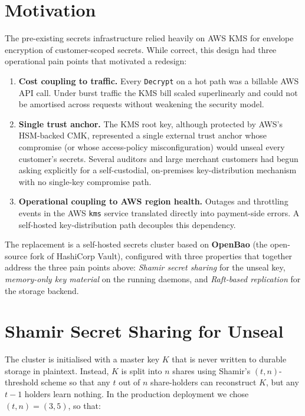 \documentclass[12pt,a4paper,oneside]{report}
\begin{document}
\section{Motivation}

The pre-existing secrets infrastructure relied heavily on AWS KMS for envelope encryption of customer-scoped secrets. While correct, this design had three operational pain points that motivated a redesign:

\begin{enumerate}[leftmargin=*]
    \item \textbf{Cost coupling to traffic.} Every \texttt{Decrypt} on a hot path was a billable AWS API call. Under burst traffic the KMS bill scaled superlinearly and could not be amortised across requests without weakening the security model.
    \item \textbf{Single trust anchor.} The KMS root key, although protected by AWS's HSM-backed CMK, represented a single external trust anchor whose compromise (or whose access-policy misconfiguration) would unseal every customer's secrets. Several auditors and large merchant customers had begun asking explicitly for a self-custodial, on-premises key-distribution mechanism with no single-key compromise path.
    \item \textbf{Operational coupling to AWS region health.} Outages and throttling events in the AWS \texttt{kms} service translated directly into payment-side errors. A self-hosted key-distribution path decouples this dependency.
\end{enumerate}

The replacement is a self-hosted secrets cluster based on \textbf{OpenBao} (the open-source fork of HashiCorp Vault), configured with three properties that together address the three pain points above: \emph{Shamir secret sharing} for the unseal key, \emph{memory-only key material} on the running daemons, and \emph{Raft-based replication} for the storage backend.

\section{Shamir Secret Sharing for Unseal}

The cluster is initialised with a master key $K$ that is never written to durable storage in plaintext. Instead, $K$ is split into $n$ shares using Shamir's $(t, n)$-threshold scheme so that any $t$ out of $n$ share-holders can reconstruct $K$, but any $t-1$ holders learn nothing. In the production deployment we chose $(t, n) = (3, 5)$, so that:
\end{document}
